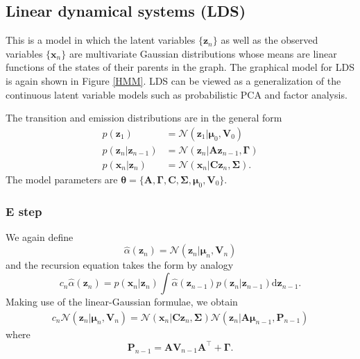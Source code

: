 \documentclass[a4paper]{report}
\newcommand{\ud}{\mathrm{d}}
\renewcommand{\bf}{\mathbf}
\renewcommand{\cal}{\mathcal}
\newcommand{\bs}{\boldsymbol}
\begin{document}
\subsection{Linear dynamical systems (LDS)}
This is a model in which the latent variables $\{\bf{z}_n\}$ as well as the observed variables $\{\bf{x}_n\}$ are multivariate Gaussian distributions whose means are linear functions of the states of their parents in the graph. The graphical model for LDS is again shown in Figure \ref{HMM}. LDS can be viewed as a generalization of the continuous latent variable models such as probabilistic PCA and factor analysis. 

The transition and emission distributions are in the general form
\begin{align}
	p(\bf{z}_1) &= \cal{N}(\bf{z}_1|\bs{\mu}_0,\bf{V}_0)\\
	p(\bf{z}_n|\bf{z}_{n-1}) &= \cal{N}(\bf{z}_n|\bf{Az}_{n-1},\bs{\Gamma}) \\
	p(\bf{x}_n|\bf{z}_n) &= \cal{N}(\bf{x}_n|\bf{Cz}_{n},\bs{\Sigma}).
\end{align}
The model parameters are $\bs{\theta}=\{ \bf{A},\bs{\Gamma},\bf{C},\bs{\Sigma},\bs{\mu}_0,\bf{V}_0 \}$.
\subsubsection{E step}
We again define
\begin{equation}
	\hat{\alpha}(\bf{z}_n) = \cal{N}(\bf{z}_n|\bs{\mu}_n,\bf{V}_n)
\end{equation}
and the recursion equation takes the form by analogy
\begin{equation}
	c_n \hat{\alpha}(\bf{z}_n) = p(\bf{x}_n|\bf{z}_n)\int \hat{\alpha}(\bf{z}_{n-1})p(\bf{z}_n|\bf{z}_{n-1})\ud \bf{z}_{n-1}.
\end{equation}
Making use of the linear-Gaussian formulae, we obtain
\begin{align}
	c_n \cal{N}(\bf{z}_n|\bs{\mu}_n,\bf{V}_n) = \cal{N}(\bf{x}_n|\bf{Cz}_n,\bs{\Sigma})\cal{N}(\bf{z}_n|\bf{A}\bs{\mu}_{n-1},\bf{P}_{n-1})
\end{align}
where
\begin{equation}
	\bf{P}_{n-1} = \bf{AV}_{n-1}\bf{A}^{\intercal} + \bs{\Gamma}.
\end{equation}
\end{document}
